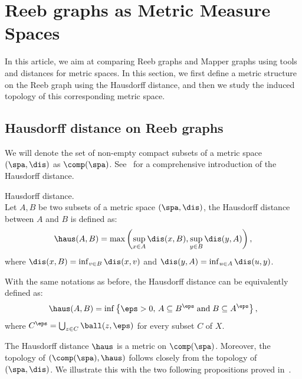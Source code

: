\section{Reeb graphs as Metric Measure Spaces}\label{sec:reeb_mms}

In this article, we aim at comparing Reeb graphs and Mapper graphs using tools and distances for metric spaces. In this section, we first define a metric structure on the Reeb graph using the Hausdorff distance, and then we study the induced topology of this corresponding metric space.

\subsection{Hausdorff distance on Reeb graphs}

We will denote the set of non-empty compact subsets of a metric space $(\spa,\dis)$ as $\comp(\spa)$.  See~\cite{henrikson1999completeness} for a comprehensive introduction of the Hausdorff distance. 

\begin{definition}{Hausdorff distance.}\\
 Let $A,B$ be two subsets of a metric space $(\spa,\dis)$, the Hausdorff distance between $A$ and $B$ is defined as:
 $$\haus(A,B)=\max\left(\sup_{x\in A}\dis(x,B),\sup_{y\in B}\dis(y,A)\right),$$
 where $\dis(x,B)=\inf_{v\in B}\dis(x,v)$ and $\dis(y,A)=\inf_{u\in A}\dis(u,y)$.
\end{definition}
With the same notations as before,  
the Hausdorff distance
can be equivalently defined as:
$$\haus(A,B)=\inf\left\{\eps>0,\,A\subseteq B^\eps\;\mathrm{ and }\;B\subseteq A^\eps\right\},$$
where $C^\eps=\bigcup_{z\in C}\ball(z,\eps)$ for every subset $C$ of $X$.

The Hausdorff distance 
$\haus$ is a metric on $\comp(\spa)$. Moreover, the topology of $(\comp(\spa),\haus)$ follows closely from the topology of $(\spa,\dis)$. We illustrate this with the two following propositions proved in~\cite{henrikson1999completeness}.

